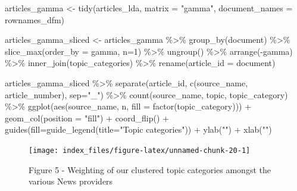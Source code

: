 \documentclass[
]{article}
\newenvironment{Shaded}{\begin{snugshade}}{\end{snugshade}}
\newcommand{\AttributeTok}[1]{\textcolor[rgb]{0.77,0.63,0.00}{#1}}
\newcommand{\DecValTok}[1]{\textcolor[rgb]{0.00,0.00,0.81}{#1}}
\newcommand{\FunctionTok}[1]{\textcolor[rgb]{0.00,0.00,0.00}{#1}}
\newcommand{\NormalTok}[1]{#1}
\newcommand{\OtherTok}[1]{\textcolor[rgb]{0.56,0.35,0.01}{#1}}
\newcommand{\SpecialCharTok}[1]{\textcolor[rgb]{0.00,0.00,0.00}{#1}}
\newcommand{\StringTok}[1]{\textcolor[rgb]{0.31,0.60,0.02}{#1}}
\begin{document}
\begin{Shaded}
\begin{Highlighting}[]
\NormalTok{articles\_gamma }\OtherTok{\textless{}{-}} \FunctionTok{tidy}\NormalTok{(articles\_lda, }\AttributeTok{matrix =} \StringTok{"gamma"}\NormalTok{, }\AttributeTok{document\_names =}\NormalTok{ rownames\_dfm)}

\NormalTok{articles\_gamma\_sliced }\OtherTok{\textless{}{-}}\NormalTok{ articles\_gamma }\SpecialCharTok{\%\textgreater{}\%}
  \FunctionTok{group\_by}\NormalTok{(document) }\SpecialCharTok{\%\textgreater{}\%}
  \FunctionTok{slice\_max}\NormalTok{(}\AttributeTok{order\_by =}\NormalTok{ gamma, }\AttributeTok{n=}\DecValTok{1}\NormalTok{) }\SpecialCharTok{\%\textgreater{}\%}
  \FunctionTok{ungroup}\NormalTok{() }\SpecialCharTok{\%\textgreater{}\%}
  \FunctionTok{arrange}\NormalTok{(}\SpecialCharTok{{-}}\NormalTok{gamma) }\SpecialCharTok{\%\textgreater{}\%}
  \FunctionTok{inner\_join}\NormalTok{(topic\_categories) }\SpecialCharTok{\%\textgreater{}\%}
  \FunctionTok{rename}\NormalTok{(}\AttributeTok{article\_id =}\NormalTok{ document)}
  
\NormalTok{articles\_gamma\_sliced }\SpecialCharTok{\%\textgreater{}\%}  
\FunctionTok{separate}\NormalTok{(article\_id, }\FunctionTok{c}\NormalTok{(}\StringTok{\textquotesingle{}source\_name\textquotesingle{}}\NormalTok{, }\StringTok{\textquotesingle{}article\_number\textquotesingle{}}\NormalTok{), }\AttributeTok{sep=}\StringTok{"\_"}\NormalTok{) }\SpecialCharTok{\%\textgreater{}\%}
\FunctionTok{count}\NormalTok{(source\_name, topic, topic\_category) }\SpecialCharTok{\%\textgreater{}\%}
\FunctionTok{ggplot}\NormalTok{(}\FunctionTok{aes}\NormalTok{(source\_name, n, }\AttributeTok{fill =} \FunctionTok{factor}\NormalTok{(topic\_category))) }\SpecialCharTok{+} 
\FunctionTok{geom\_col}\NormalTok{(}\AttributeTok{position =} \StringTok{"fill"}\NormalTok{) }\SpecialCharTok{+} 
\FunctionTok{coord\_flip}\NormalTok{() }\SpecialCharTok{+} 
\FunctionTok{guides}\NormalTok{(}\AttributeTok{fill=}\FunctionTok{guide\_legend}\NormalTok{(}\AttributeTok{title=}\StringTok{"Topic categories"}\NormalTok{)) }\SpecialCharTok{+}
\FunctionTok{ylab}\NormalTok{(}\StringTok{""}\NormalTok{) }\SpecialCharTok{+}
\FunctionTok{xlab}\NormalTok{(}\StringTok{""}\NormalTok{)}
\end{Highlighting}
\end{Shaded}

\begin{figure}

{\centering \texttt{[image: index\_files/figure-latex/unnamed-chunk-20-1]} 

}

\caption{Figure 5 - Weighting of our clustered topic categories amongst the various News providers}\label{fig:unnamed-chunk-20}
\end{figure}
\end{document}
